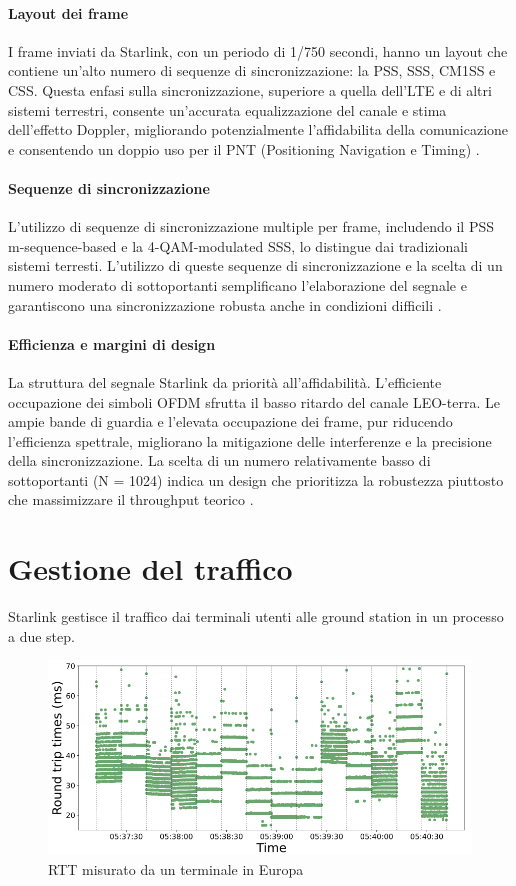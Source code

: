 \paragraph{Layout dei frame}
I frame inviati da Starlink, con un periodo di 1/750 secondi, hanno un layout che contiene un'alto numero di sequenze di sincronizzazione: la PSS, SSS, CM1SS e CSS.
Questa enfasi sulla sincronizzazione, superiore a quella dell'LTE e di altri sistemi terrestri, consente un'accurata equalizzazione del canale e stima dell'effetto Doppler, migliorando potenzialmente l'affidabilita della comunicazione e consentendo un doppio uso per il PNT (Positioning Navigation e Timing) \cite{humphreys_signal_2023}.

\paragraph{Sequenze di sincronizzazione}
L'utilizzo di sequenze di sincronizzazione multiple per frame, includendo il PSS m-sequence-based e la 4-\ac{QAM}-modulated SSS, lo distingue dai tradizionali sistemi terresti.
L'utilizzo di queste sequenze di sincronizzazione e la scelta di un numero moderato di sottoportanti semplificano l'elaborazione del segnale e garantiscono una sincronizzazione robusta anche in condizioni difficili \cite{humphreys_signal_2023}.

\paragraph{Efficienza e margini di design}
La struttura del segnale Starlink da priorità all'affidabilità.
L'efficiente occupazione dei simboli OFDM sfrutta il basso ritardo del canale \ac{LEO}-terra.
Le ampie bande di guardia e l'elevata occupazione dei frame, pur riducendo l'efficienza spettrale, migliorano la mitigazione delle interferenze e la precisione della sincronizzazione.
La scelta di un numero relativamente basso di sottoportanti (N = 1024) indica un design che prioritizza la robustezza piuttosto che massimizzare il throughput teorico \cite{humphreys_signal_2023}.

\section{Gestione del traffico}
Starlink gestisce il traffico dai terminali utenti alle ground station in un processo a due step.

\begin{figure}[htbp]
  \centering
  \includegraphics[width=0.8\linewidth]{./res/img/rtt_euterminal.png}
  \caption{\ac{RTT} misurato da un terminale in Europa \cite{tanveer_making_2023}}
  \label{fig:rtt-euterminal}
\end{figure}

